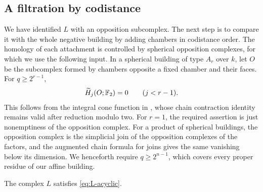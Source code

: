 \subsection{A filtration by codistance}

We have identified $L$ with an opposition subcomplex. The next step is
to compare it with the whole negative building by adding chambers in
codistance order. The homology of each attachment is controlled by
spherical opposition complexes, for which we use the following input.
In a
spherical building of type $A_r$ over $k$, let $O$ be the subcomplex formed
by chambers opposite a fixed chamber and their faces. For
$q\ge2^{r-1}$,
\begin{equation}\label{eq:spherical-opposition}
 \widetilde H_j(O;\mathbb F_2)=0\qquad(j<r-1).
\end{equation}
This follows from the integral cone function in
\cite[Corollary~6.10]{OVB}, whose chain contraction identity remains valid
after reduction modulo two. For $r=1$, the required assertion is just
nonemptiness of the opposition complex. For a product of spherical buildings, the
opposition complex is the simplicial join of the opposition complexes
of the factors, and the augmented chain formula for joins gives the
same vanishing below its dimension. We henceforth require $q\ge2^{n-1}$,
which covers every proper residue of our affine building.

\begin{proposition}\label{prop:L-acyclic}
The complex $L$ satisfies \eqref{eq:L-acyclic}.
\end{proposition}


